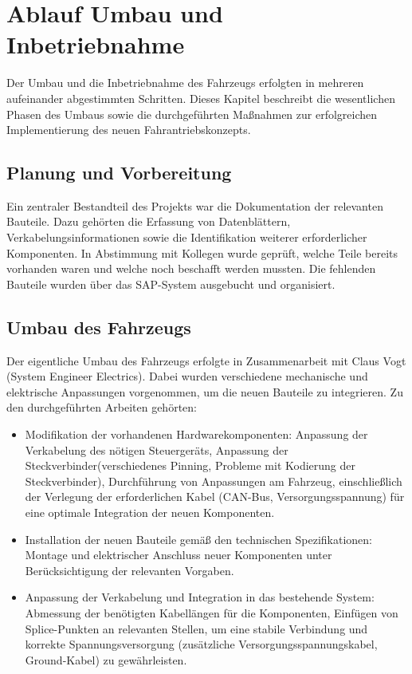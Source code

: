 \documentclass[a4paper, 12pt]{article} %
\begin{document}
\section{Ablauf Umbau und Inbetriebnahme}
\begin{spacing}{1.5}  %
    \fontsize{14pt}{14pt}\selectfont  %

Der Umbau und die Inbetriebnahme des Fahrzeugs erfolgten in mehreren aufeinander abgestimmten Schritten. 
 Dieses Kapitel beschreibt die wesentlichen Phasen des Umbaus sowie die durchgeführten 
Maßnahmen zur erfolgreichen Implementierung des neuen Fahrantriebskonzepts. 

\subsection{Planung und Vorbereitung}
Ein zentraler Bestandteil des Projekts war die Dokumentation der relevanten Bauteile. Dazu gehörten die Erfassung von Datenblättern,
 Verkabelungsinformationen sowie die Identifikation weiterer erforderlicher Komponenten. In Abstimmung mit Kollegen wurde geprüft, 
 welche Teile bereits vorhanden waren und welche noch beschafft werden mussten. Die fehlenden Bauteile wurden über das \ac{SAP}-System ausgebucht 
 und organisiert.

 \subsection{Umbau des Fahrzeugs}
 Der eigentliche Umbau des Fahrzeugs erfolgte in Zusammenarbeit mit Claus Vogt (System Engineer Electrics). Dabei wurden verschiedene
 mechanische und elektrische Anpassungen vorgenommen, um die neuen Bauteile zu integrieren. 
 Zu den durchgeführten Arbeiten gehörten:
 
    \begin{itemize}
        \item Modifikation der vorhandenen Hardwarekomponenten: Anpassung der Verkabelung des nötigen Steuergeräts, Anpassung der Steckverbinder(verschiedenes Pinning, Probleme mit Kodierung der Steckverbinder), Durchführung von Anpassungen am Fahrzeug, einschließlich der Verlegung der erforderlichen Kabel (\acf{CAN}-Bus, Versorgungsspannung) für eine optimale Integration der neuen Komponenten.
        \item Installation der neuen Bauteile gemäß den technischen Spezifikationen: Montage und elektrischer Anschluss neuer Komponenten unter Berücksichtigung der relevanten Vorgaben.
        \item Anpassung der Verkabelung und Integration in das bestehende System: Abmessung der benötigten Kabellängen für die Komponenten, Einfügen von Splice-Punkten an relevanten Stellen, um eine stabile Verbindung und korrekte Spannungsversorgung (zusätzliche Versorgungsspannungskabel, Ground-Kabel) zu gewährleisten.
    \end{itemize}


\end{spacing}
\end{document}
